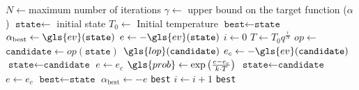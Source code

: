 \begin{algorithmic}[1]
	\Require $N\gets $maximum number of iterations
	\Require $\gamma\gets$ upper bound on the target function ($\alpha$) 
	\Require $\texttt{state} \gets$ initial state
	\Require $T_0 \gets$ Initial temperature
		\State $\texttt{best} \gets \texttt{state}$
		\State $\alpha_{\text{best}} \gets \gls{ev}(\texttt{state})$
        \State $e \gets -\gls{ev}(\texttt{state})$ 
		\State $i \gets 0$
			\State $T\gets T_0 q^{\frac{i}{N}}$
            \State $op\gets$
            \State $\texttt{candidate} \gets op(\texttt{state})$
            \State $\gls{lop}(\texttt{candidate})$
			\State $e_c \gets -\gls{ev}(\texttt{candidate})$ 
                \State $\texttt{state} \gets \texttt{candidate}$
				\State $e \gets e_c$
			\Else
                \State $\gls{prob} \gets \exp{ \left( \frac{e-e_c}{k\cdot T} \right) }$
					\State $\texttt{state} \gets \texttt{candidate}$
					\State $e \gets e_c$
				\EndIf
			\EndIf
				\State $\texttt{best} \gets \texttt{state}$
				\State $\alpha_{\text{best}} \gets -e$
			\EndIf
				\State \Return \texttt{best}
			\EndIf
			\State $i\gets i+1$
		\EndWhile
		\State \Return \texttt{best}
	\EndProcedure
\end{algorithmic}
